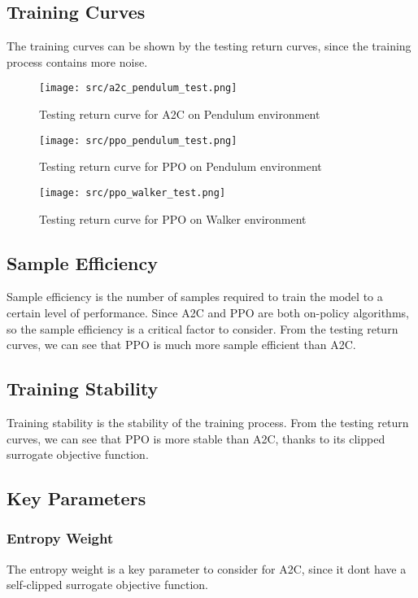 \subsection{Training Curves}
The training curves can be shown by the testing return curves, since the training process contains more noise.


\begin{figure}[ht]
    \centering
    \texttt{[image: src/a2c\_pendulum\_test.png]}
    \caption{Testing return curve for A2C on Pendulum environment}
    \label{fig:a2c_pendulum_test}
\end{figure}

\begin{figure}[ht]
    \centering
    \texttt{[image: src/ppo\_pendulum\_test.png]}
    \caption{Testing return curve for PPO on Pendulum environment}
    \label{fig:ppo_pendulum_test}
\end{figure}

\begin{figure}[ht]
    \centering
    \texttt{[image: src/ppo\_walker\_test.png]}
    \caption{Testing return curve for PPO on Walker environment}
    \label{fig:ppo_walker_test}
\end{figure}

\subsection{Sample Efficiency}
Sample efficiency is the number of samples required to train the model to a certain level of performance.
Since A2C and PPO are both on-policy algorithms, so the sample efficiency is a critical factor to consider.
From the testing return curves, we can see that PPO is much more sample efficient than A2C.

\subsection{Training Stability}
Training stability is the stability of the training process.
From the testing return curves, we can see that PPO is more stable than A2C, thanks to its clipped surrogate objective function.

\subsection{Key Parameters}
\subsubsection{Entropy Weight}
The entropy weight is a key parameter to consider for A2C, since it dont have a self-clipped surrogate objective function.

